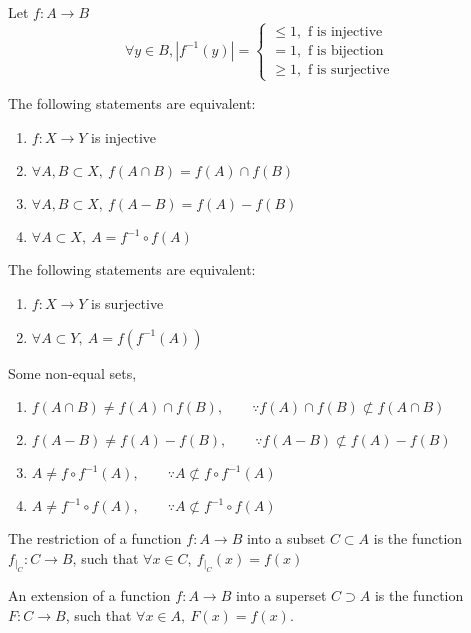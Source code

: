 	\begin{remark} Let $f:A\to B$
		$$\forall y \in B, |f^{-1}(y)| = \begin{cases}
			\leq 1, \text{ f is injective }\\
			= 1, \text{ f is bijection }\\
			\geq 1, \text{ f is surjective}
		\end{cases}$$
	\end{remark}
	\begin{remark}The following statements are equivalent:
		\begin{enumerate}
			\item $f : X \to Y$ is injective
		 	\item $\forall A,B \subset X,\ f(A\cap B) = f(A) \cap f(B)$ 
		 	\item $\forall A,B \subset X,\ f(A-B) = f(A)-f(B)$
		 	\item $\forall A \subset X,\ A = f^{-1}\circ f(A)$
		\end{enumerate}
	\end{remark}
	\begin{remark}The following statements are equivalent:
		\begin{enumerate}
			\item $f : X \to Y$ is surjective
		 	\item $\forall A \subset Y,\ A = f(f^{-1}(A))$
		\end{enumerate}
	\end{remark}
	\begin{remark} Some non-equal sets,
		\begin{enumerate}
			 \item $f(A\cap B) \neq f(A) \cap f(B),\qquad \because f(A) \cap f(B) \not\subset f(A\cap B)$
			 \item $f(A-B) \neq f(A)-f(B),\qquad  \because f(A-B) \not\subset f(A)-f(B)$
			 \item $A \neq f \circ f^{-1}(A),\qquad \because A \not\subset f \circ f^{-1}(A)$
			 \item $A \neq f^{-1} \circ f(A),\qquad \because A \not\subset f^{-1}\circ f(A)$
		\end{enumerate}
	\end{remark}
	\begin{definition}
		The restriction of a function $f:A \to B$ into a subset $C \subset A$ is the function $f_{|_C} : C \to B$, such that $\forall x \in C,\ f_{|_C}(x) = f(x)$
	\end{definition}
	\begin{definition}
		An extension of a function $f:A \to B$ into a superset $C \supset A$ is the function $F:C \to B$, such that $\forall x \in A,\ F(x)=f(x)$.
	\end{definition}
